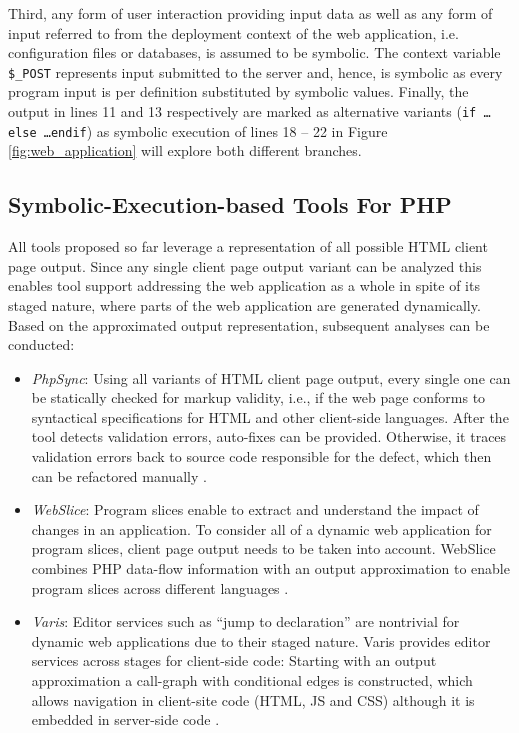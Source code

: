\documentclass[sigconf]{acmart}
\begin{document}
Third, any form of user interaction providing input data as well as any form of input referred
to from the deployment context of the web application, i.e. configuration files
or databases, is assumed to be symbolic. The context variable
\texttt{\$\_POST} represents input submitted to the server and, hence, is
symbolic as every program input is per definition substituted by symbolic values. Finally, the
output in lines 11 and 13 respectively are marked as alternative variants
(\texttt{if \ldots else \ldots endif}) as symbolic execution of lines 18 – 22
in Figure \ref{fig:web_application} will explore both different branches.

\subsection{Symbolic-Execution-based Tools For PHP}\label{sec:existing_tools}
All tools proposed so far leverage a representation of all possible HTML client
page output. Since any single client page output variant can be analyzed this
enables tool support addressing the web application as a whole in spite of its
staged nature, where parts of the web application are
generated dynamically.
Based on the approximated output representation, subsequent analyses can be
conducted:
\begin{itemize}
	\item \emph{PhpSync}: Using all variants of  HTML client page output, every
	single one can be statically checked for markup validity, i.e., if the web page
	conforms to syntactical specifications for HTML and other client-side
	languages. After the tool detects validation errors, auto-fixes
	can be provided. Otherwise, it traces validation errors back to
	source code responsible for the defect, which then can be refactored manually
	\cite{Nguyen:2011:AFH:2190078.2190142}. 

	\item \emph{WebSlice}: Program slices enable to extract and understand the
	impact of changes in an application. To consider all of a dynamic web
	application for program slices, client page output needs to be taken into
	account. WebSlice combines PHP data-flow information with an output
	approximation to enable program slices across different languages
	\cite{Nguyen:2015:CPS:2786805.2786872}.

	\item \emph{Varis}: Editor services such as “jump to declaration” are
	nontrivial for dynamic web applications due to their staged nature. Varis
	provides editor services across stages for client-side code: Starting with an
	output approximation a call-graph with conditional edges is constructed, which
	allows navigation in client-site code (HTML, JS and CSS) although it is
	embedded in server-side code
	\cite{Nguyen:2015:VIS:2819009.2819140,Nguyen:2014:BCG:2635868.2635928}.

\end{itemize}
\end{document}
